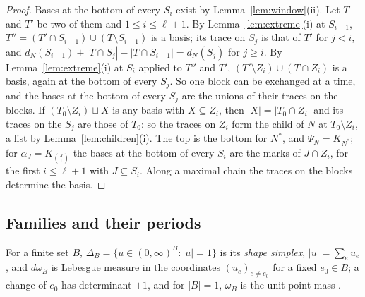 \documentclass[11pt]{article}
\theoremstyle{plain}
\theoremstyle{definition}
\theoremstyle{remark}
\begin{document}
\begin{proof}
Bases at the bottom of every $S_i$ exist by Lemma~\ref{lem:window}(ii). Let $T$ and $T'$ be two of them and $1\le i\le\ell+1$. By Lemma~\ref{lem:extreme}(i) at $S_{i-1}$, $T''=(T'\cap S_{i-1})\cup(T\setminus S_{i-1})$ is a basis; its trace on $S_j$ is that of $T'$ for $j<i$, and $d_N(S_{i-1})+|T\cap S_j|-|T\cap S_{i-1}|=d_N(S_j)$ for $j\ge i$. By Lemma~\ref{lem:extreme}(i) at $S_i$ applied to $T''$ and $T'$, $(T'\setminus Z_i)\cup(T\cap Z_i)$ is a basis, again at the bottom of every $S_j$. So one block can be exchanged at a time, and the bases at the bottom of every $S_j$ are the unions of their traces on the blocks. If $(T_0\setminus Z_i)\sqcup X$ is any basis with $X\subseteq Z_i$, then $|X|=|T_0\cap Z_i|$ and its traces on the $S_j$ are those of $T_0$: so the traces on $Z_i$ form the child of $N$ at $T_0\setminus Z_i$, a list by Lemma~\ref{lem:children}(i). The top is the bottom for $N^\ast$, and $\Psi_N=K_{N^\ast}$; for $\alpha_J=K_{\binom J1}$ the bases at the bottom of every $S_i$ are the marks of $J\cap Z_i$, for the first $i\le\ell+1$ with $J\subseteq S_i$. Along a maximal chain the traces on the blocks determine the basis.
\end{proof}

\subsection{Families and their periods}

For a finite set $B$, $\Delta_B=\{u\in(0,\infty)^B:|u|=1\}$ is its \emph{shape simplex}, $|u|=\sum_eu_e$, and $d\omega_B$ is Lebesgue measure in the coordinates $(u_e)_{e\neq e_0}$ for a fixed $e_0\in B$; a change of $e_0$ has determinant $\pm1$, and for $|B|=1$, $\omega_B$ is the unit point mass \cite[Def.~1.1(iii), p.~10]{F}.
\end{document}
